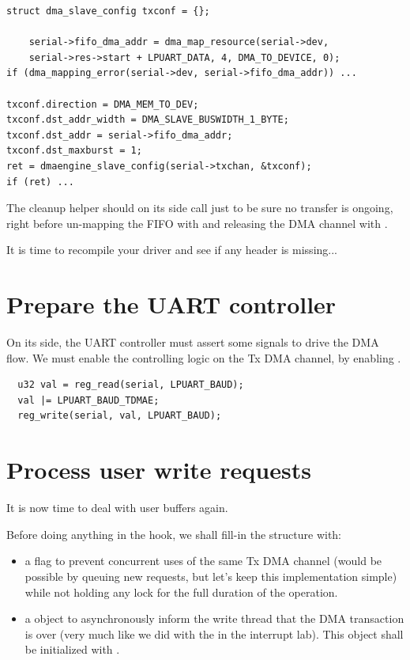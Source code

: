 \begin{verbatim}
struct dma_slave_config txconf = {};

    serial->fifo_dma_addr = dma_map_resource(serial->dev,
    serial->res->start + LPUART_DATA, 4, DMA_TO_DEVICE, 0);
if (dma_mapping_error(serial->dev, serial->fifo_dma_addr)) ...

txconf.direction = DMA_MEM_TO_DEV;
txconf.dst_addr_width = DMA_SLAVE_BUSWIDTH_1_BYTE;
txconf.dst_addr = serial->fifo_dma_addr;
txconf.dst_maxburst = 1;
ret = dmaengine_slave_config(serial->txchan, &txconf);
if (ret) ...
\end{verbatim}

The cleanup helper should on its side call
 just to be sure no transfer is
ongoing, right before un-mapping the FIFO with  and
releasing the DMA channel with .

It is time to recompile your driver and see if any header is missing...

\section{Prepare the UART controller}

On its side, the UART controller must assert some signals to drive the DMA
flow. We must enable the controlling logic on the Tx DMA channel, by enabling
.

\begin{verbatim}
  u32 val = reg_read(serial, LPUART_BAUD);
  val |= LPUART_BAUD_TDMAE;
  reg_write(serial, val, LPUART_BAUD);
\end{verbatim}

\section{Process user write requests}

It is now time to deal with user buffers again.

Before doing anything in the  hook, we shall fill-in the
 structure with:
\begin{itemize}
\item a  flag to prevent concurrent uses of the same
  Tx DMA channel (would be possible by queuing new requests, but let's keep this
  implementation simple) while not holding any lock for the full duration of
  the operation.
\item a  object to asynchronously inform the
  write thread that the DMA transaction is over (very much like we did with the
   in the interrupt lab). This object shall be initialized with
  .
\end{itemize}

